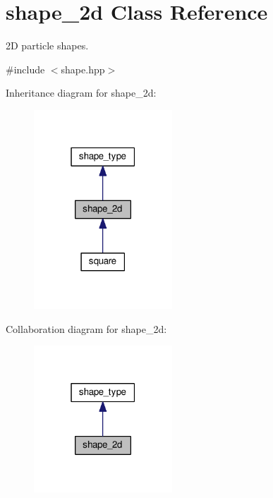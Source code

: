 \hypertarget{classshape__2d}{}\section{shape\+\_\+2d Class Reference}
\label{classshape__2d}


2D particle shapes.  




{\ttfamily \#include $<$shape.\+hpp$>$}



Inheritance diagram for shape\+\_\+2d\+:
\nopagebreak
\begin{figure}[H]
\begin{center}
\leavevmode
\includegraphics[width=147pt]{d8/dbc/classshape__2d__inherit__graph}
\end{center}
\end{figure}


Collaboration diagram for shape\+\_\+2d\+:
\nopagebreak
\begin{figure}[H]
\begin{center}
\leavevmode
\includegraphics[width=147pt]{d5/da9/classshape__2d__coll__graph}
\end{center}
\end{figure}
